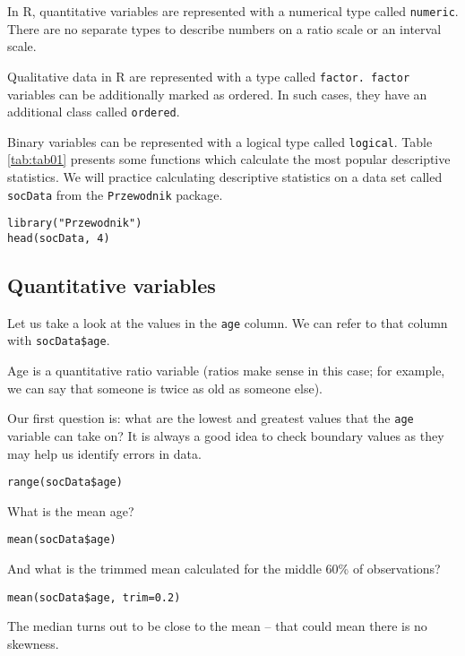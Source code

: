\documentclass[]{book}
\theoremstyle{definition}
\theoremstyle{definition}
\theoremstyle{definition}
\theoremstyle{remark}
\begin{document}
In R, quantitative variables are represented with a numerical type
called \texttt{numeric}. There are no separate types to describe numbers
on a ratio scale or an interval scale.

Qualitative data in R are represented with a type called
\texttt{factor.\ factor} variables can be additionally marked as
ordered. In such cases, they have an additional class called
\texttt{ordered}.

Binary variables can be represented with a logical type called
\texttt{logical}. Table \ref{tab:tab01} presents some functions which
calculate the most popular descriptive statistics. We will practice
calculating descriptive statistics on a data set called \texttt{socData}
from the \texttt{Przewodnik} package.

\begin{verbatim}
library("Przewodnik")
head(socData, 4)
\end{verbatim}

\subsection{Quantitative variables}\label{part_231}

Let us take a look at the values in the \texttt{age} column. We can
refer to that column with \texttt{socData\$age}.

Age is a quantitative ratio variable (ratios make sense in this case;
for example, we can say that someone is twice as old as someone else).

Our first question is: what are the lowest and greatest values that the
\texttt{age} variable can take on? It is always a good idea to check
boundary values as they may help us identify errors in data.

\begin{verbatim}
range(socData$age)
\end{verbatim}

What is the mean age?

\begin{verbatim}
mean(socData$age)
\end{verbatim}

And what is the trimmed mean calculated for the middle 60\% of
observations?

\begin{verbatim}
mean(socData$age, trim=0.2)
\end{verbatim}

The median turns out to be close to the mean -- that could mean there is
no skewness.
\end{document}
